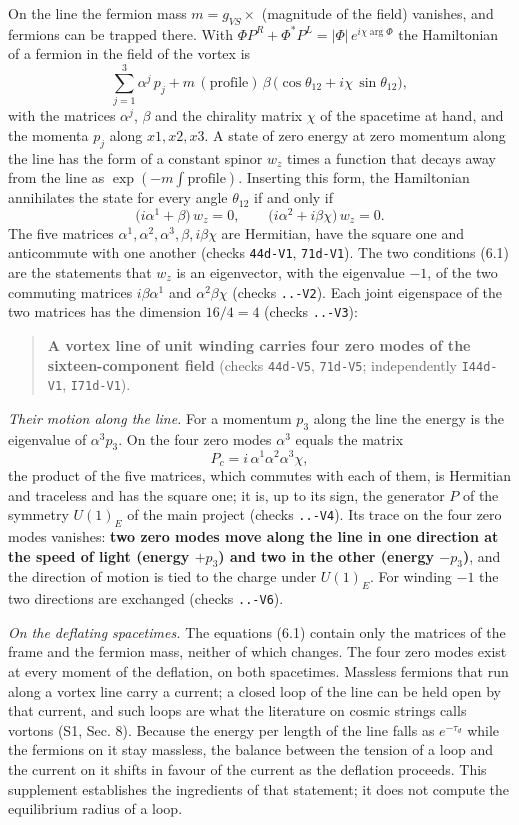 \documentclass[
  10pt,
]{article}
\begin{document}
On the line the fermion mass \(m=g_{VS}\times\) (magnitude of the field)
vanishes, and fermions can be trapped there. With
\(\Phi P^R+\Phi^*P^L=\lvert\Phi\rvert\,e^{i\chi\arg\Phi}\) the
Hamiltonian of a fermion in the field of the vortex is
\[\sum_{j=1}^3\alpha^j\,p_j+m\,(\text{profile})\,\beta\,\big(\cos\theta_{12}+i\chi\,\sin\theta_{12}\big),\]
with the matrices \(\alpha^j\), \(\beta\) and the chirality matrix
\(\chi\) of the spacetime at hand, and the momenta \(p_j\) along
\(x1,x2,x3\). A state of zero energy at zero momentum along the line has
the form of a constant spinor \(w_z\) times a function that decays away
from the line as \(\exp(-m\int\text{profile})\). Inserting this form,
the Hamiltonian annihilates the state for every angle \(\theta_{12}\) if
and only if
\[\big(i\alpha^1+\beta\big)\,w_z=0,\qquad\big(i\alpha^2+i\beta\chi\big)\,w_z=0 .\tag{6.1}\]
The five matrices \(\alpha^1,\alpha^2,\alpha^3,\beta,i\beta\chi\) are
Hermitian, have the square one and anticommute with one another (checks
\texttt{44d-V1}, \texttt{71d-V1}). The two conditions (6.1) are the
statements that \(w_z\) is an eigenvector, with the eigenvalue \(-1\),
of the two commuting matrices \(i\beta\alpha^1\) and
\(\alpha^2\beta\chi\) (checks \texttt{..-V2}). Each joint eigenspace of
the two matrices has the dimension \(16/4=4\) (checks \texttt{..-V3}):

\begin{quote}
\textbf{A vortex line of unit winding carries four zero modes of the
sixteen-component field} (checks \texttt{44d-V5}, \texttt{71d-V5};
independently \texttt{I44d-V1}, \texttt{I71d-V1}).
\end{quote}

\emph{Their motion along the line.} For a momentum \(p_3\) along the
line the energy is the eigenvalue of \(\alpha^3p_3\). On the four zero
modes \(\alpha^3\) equals the matrix
\[P_c=i\,\alpha^1\alpha^2\alpha^3\chi,\] the product of the five
matrices, which commutes with each of them, is Hermitian and traceless
and has the square one; it is, up to its sign, the generator \(P\) of
the symmetry \(U(1)_E\) of the main project (checks \texttt{..-V4}). Its
trace on the four zero modes vanishes: \textbf{two zero modes move along
the line in one direction at the speed of light (energy \(+p_3\)) and
two in the other (energy \(-p_3\))}, and the direction of motion is tied
to the charge under \(U(1)_E\). For winding \(-1\) the two directions
are exchanged (checks \texttt{..-V6}).

\emph{On the deflating spacetimes.} The equations (6.1) contain only the
matrices of the frame and the fermion mass, neither of which changes.
The four zero modes exist at every moment of the deflation, on both
spacetimes. Massless fermions that run along a vortex line carry a
current; a closed loop of the line can be held open by that current, and
such loops are what the literature on cosmic strings calls vortons (S1,
Sec. 8). Because the energy per length of the line falls as
\(e^{-\tau_d}\) while the fermions on it stay massless, the balance
between the tension of a loop and the current on it shifts in favour of
the current as the deflation proceeds. This supplement establishes the
ingredients of that statement; it does not compute the equilibrium
radius of a loop.
\end{document}
